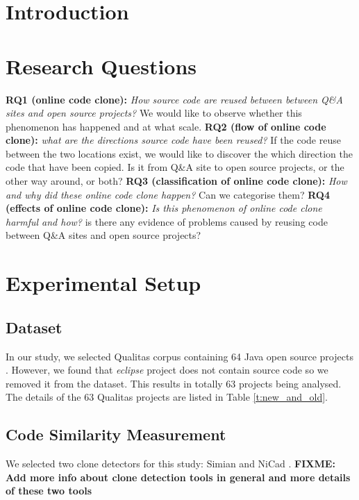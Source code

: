 \documentclass{sig-alternate-05-2015}
\newcommand\FIXME[1]{\textbf{FIXME: #1}}
\begin{document}
\section{Introduction}

\section{Research Questions}
\textbf{RQ1 (online code clone):} \textit{How source code are reused between between Q\&A sites and open source projects?} We would like to observe whether this phenomenon has happened and at what scale. \newline
\textbf{RQ2 (flow of online code clone):} \textit{what are the directions source code have been reused?} If the code reuse between the two locations exist, we would like to discover the which direction the code that have been copied. Is it from Q\&A site to open source projects, or the other way around, or both? \newline
\textbf{RQ3 (classification of online code clone):} \textit{How and why did these online code clone happen?} Can we categorise them? \newline
\textbf{RQ4 (effects of online code clone):} \textit{ Is this phenomenon of online code clone harmful and how?} is there any evidence of problems caused by reusing code between Q\&A sites and open source projects?

\section{Experimental Setup}

\subsection{Dataset}
In our study, we selected Qualitas corpus containing 64 Java open source projects \cite{QualitasCorpus}. However, we found that \textit{eclipse} project does not contain source code so we removed it from the dataset. This results in totally 63 projects being analysed. The details of the 63 Qualitas projects are listed in Table \ref{t:new_and_old}.

\subsection{Code Similarity Measurement}
We selected two clone detectors for this study: Simian \cite{simian} and NiCad \cite{Cordy,Roy2008}. \FIXME{Add more info about clone detection tools in general and more details of these two tools} 
\end{document}
